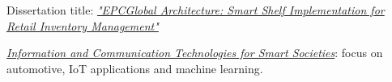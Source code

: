 \documentclass[10pt,a4paper,ragged2e,withhyper]{altacv}
\begin{document}
\begin{paracol}{2}
\switchcolumn




Dissertation title: \href{https://github.com/dvcorreia/epc-smart-shelve}{\textit{"EPCGlobal Architecture: Smart Shelf Implementation for Retail Inventory Management"}}

\divider

\href{https://www.polito.it/en/education/master-s-degree-programmes/ict-for-smart-societies}{\textit{Information and Communication Technologies for Smart Societies}}: focus on automotive, IoT applications and machine learning.

\medskip










\divider\smallskip





\end{paracol}
\end{document}
